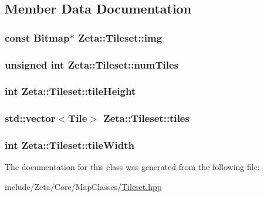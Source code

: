 \subsection{Member Data Documentation}
\hypertarget{classZeta_1_1Tileset_a489e70507ae6d8b72fb9fe0f902d6f09}{
\subsubsection[{img}]{\setlength{\rightskip}{0pt plus 5cm}const {\bf Bitmap}$\ast$ Zeta\+::\+Tileset\+::img\hspace{0.3cm}{\ttfamily [protected]}}}\label{classZeta_1_1Tileset_a489e70507ae6d8b72fb9fe0f902d6f09}
\hypertarget{classZeta_1_1Tileset_a3f4b2bd8dd2232ddd13f36f0fd6c45e5}{
\subsubsection[{num\+Tiles}]{\setlength{\rightskip}{0pt plus 5cm}unsigned int Zeta\+::\+Tileset\+::num\+Tiles\hspace{0.3cm}{\ttfamily [protected]}}}\label{classZeta_1_1Tileset_a3f4b2bd8dd2232ddd13f36f0fd6c45e5}
\hypertarget{classZeta_1_1Tileset_a5de00da0d0b2ac5b6fe03b1a4a024867}{
\subsubsection[{tile\+Height}]{\setlength{\rightskip}{0pt plus 5cm}int Zeta\+::\+Tileset\+::tile\+Height\hspace{0.3cm}{\ttfamily [protected]}}}\label{classZeta_1_1Tileset_a5de00da0d0b2ac5b6fe03b1a4a024867}
\hypertarget{classZeta_1_1Tileset_adc7b8608cb43ca104c1f93254d5f59f3}{
\subsubsection[{tiles}]{\setlength{\rightskip}{0pt plus 5cm}std\+::vector$<${\bf Tile}$>$ Zeta\+::\+Tileset\+::tiles\hspace{0.3cm}{\ttfamily [protected]}}}\label{classZeta_1_1Tileset_adc7b8608cb43ca104c1f93254d5f59f3}
\hypertarget{classZeta_1_1Tileset_a1ea0b39b40b488f44813f854d55914be}{
\subsubsection[{tile\+Width}]{\setlength{\rightskip}{0pt plus 5cm}int Zeta\+::\+Tileset\+::tile\+Width\hspace{0.3cm}{\ttfamily [protected]}}}\label{classZeta_1_1Tileset_a1ea0b39b40b488f44813f854d55914be}


The documentation for this class was generated from the following file\+:\begin{DoxyCompactItemize}
\item 
include/\+Zeta/\+Core/\+Map\+Classes/\hyperlink{Tileset_8hpp}{Tileset.\+hpp}\end{DoxyCompactItemize}
